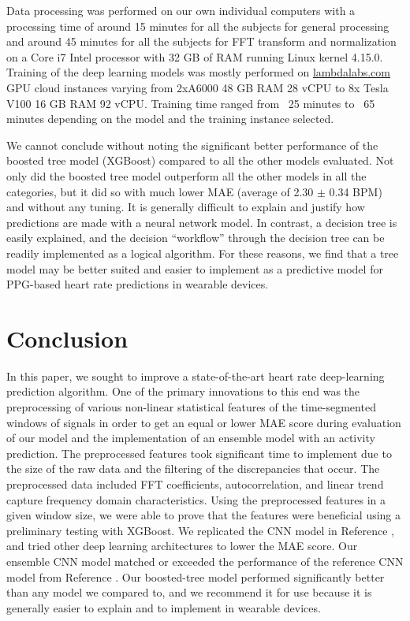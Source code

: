 \documentclass[12pt, conference]{IEEEtran}
\begin{document}
Data processing was performed on our own individual computers with a processing time of around 15 minutes for all the subjects for general processing and around 45 minutes for all the subjects for FFT transform and normalization on a Core i7 Intel processor with 32 GB of RAM running Linux kernel 4.15.0. Training of the deep learning models was mostly performed on \url{lambdalabs.com} GPU cloud instances varying from 2xA6000 48 GB RAM 28 vCPU to 8x Tesla V100 16 GB RAM 92 vCPU. Training time ranged from ~25 minutes to ~65 minutes depending on the model and the training instance selected.

We cannot conclude without noting the significant better performance of the boosted tree model (XGBoost) compared to all the other models evaluated. Not only did the boosted tree model outperform all the other models in all the categories, but it did so with much lower MAE (average of  2.30 $\pm$ 0.34 BPM) and without any tuning. It is generally difficult to explain and justify how predictions are made with a neural network model. In contrast, a decision tree is easily explained, and the  decision “workflow” through the decision tree can be readily implemented as a logical algorithm. For these reasons, we find that a tree model may be better suited and easier to implement as a predictive model for PPG-based heart rate predictions in wearable devices.

\section{Conclusion}

In this paper, we sought to improve a state-of-the-art heart rate deep-learning prediction algorithm. One of the primary innovations to this end was the preprocessing of various non-linear statistical features of the time-segmented windows of signals in order to get an equal or lower MAE score during evaluation of our model and the implementation of an ensemble model with an activity prediction. The preprocessed features took significant time to implement due to the size of the raw data and the filtering of the discrepancies that occur. The preprocessed data included FFT coefficients, autocorrelation, and linear trend capture frequency domain characteristics. Using the preprocessed features in a given window size, we were able to prove that the features were beneficial using a preliminary testing with XGBoost. We replicated the CNN model in Reference \cite{reiss2019deep}, and tried other deep learning architectures to lower the MAE score. Our ensemble CNN model matched or exceeded the performance of the reference CNN model from Reference \cite{reiss2019deep}. Our boosted-tree model performed significantly better than any model we compared to, and we recommend it for use because it is generally easier to explain and to implement in wearable devices.
\end{document}
